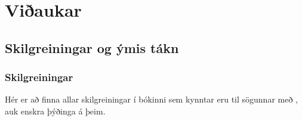 \part*{Viðaukar}

\chapter{Skilgreiningar og ýmis tákn}\label{app.notation} %

\section{Skilgreiningar}

Hér er að finna allar skilgreiningar í bókinni sem kynntar eru til sögunnar með , auk enskra þýðinga á þeim.

